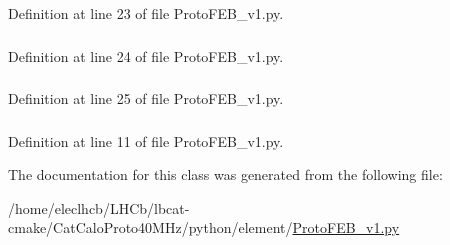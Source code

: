 Definition at line 23 of file ProtoFEB\_\-v1.py.\hypertarget{classProtoFEB__v1_1_1ProtoFEB__v1_a52cb09809a670c1c643f8421d31cda5e}{
\subsubsection[{ph2\_\-2}]{}}
\label{classProtoFEB__v1_1_1ProtoFEB__v1_a52cb09809a670c1c643f8421d31cda5e}


Definition at line 24 of file ProtoFEB\_\-v1.py.\hypertarget{classProtoFEB__v1_1_1ProtoFEB__v1_a1985e6c1191761622cee61f3987e23d4}{
\subsubsection[{ph2\_\-3}]{}}
\label{classProtoFEB__v1_1_1ProtoFEB__v1_a1985e6c1191761622cee61f3987e23d4}


Definition at line 25 of file ProtoFEB\_\-v1.py.\hypertarget{classProtoFEB__v1_1_1ProtoFEB__v1_a3ea716a290c9ca4fd5b1bb04f41b69c5}{
\subsubsection[{softTrig}]{}}
\label{classProtoFEB__v1_1_1ProtoFEB__v1_a3ea716a290c9ca4fd5b1bb04f41b69c5}


Definition at line 11 of file ProtoFEB\_\-v1.py.

The documentation for this class was generated from the following file:\begin{DoxyCompactItemize}
\item 
/home/eleclhcb/LHCb/lbcat-\/cmake/CatCaloProto40MHz/python/element/\hyperlink{ProtoFEB__v1_8py}{ProtoFEB\_\-v1.py}\end{DoxyCompactItemize}

